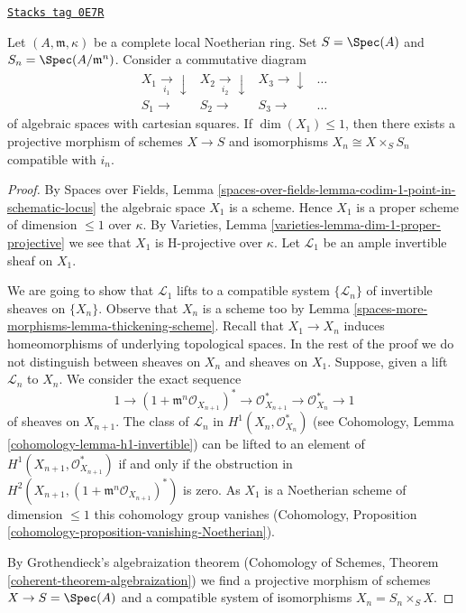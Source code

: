 \begin{lemma}
\label{spaces-more-morphisms-lemma-formal-algebraic-space-proper-reldim-1}
\href{https://stacks.math.columbia.edu/tag/0E7R}{\texttt{Stacks tag 0E7R}}

Let $(A, \mathfrak m, \kappa)$ be a complete local Noetherian ring.
Set $S = \Spec(A)$ and $S_n = \Spec(A/\mathfrak m^n)$.
Consider a commutative diagram
$$
\begin{array}{cccc}X_1 \underset{i_1}{\longrightarrow}\downarrow & X_2 \underset{i_2}{\longrightarrow}\downarrow & X_3 \longrightarrow\downarrow & \ldots \\ S_1 \longrightarrow & S_2 \longrightarrow & S_3 \longrightarrow & \ldots\end{array}
$$
of algebraic spaces with cartesian squares. If $\dim(X_1) \leq 1$,
then there exists a projective morphism of schemes $X \to S$
and isomorphisms $X_n \cong X \times_S S_n$ compatible with $i_n$.
\end{lemma}

\begin{proof}
By Spaces over Fields, Lemma
\ref{spaces-over-fields-lemma-codim-1-point-in-schematic-locus}
the algebraic space $X_1$ is a scheme. Hence $X_1$
is a proper scheme of dimension $\leq 1$ over $\kappa$.
By Varieties, Lemma \ref{varieties-lemma-dim-1-proper-projective}
we see that $X_1$ is H-projective over $\kappa$.
Let $\mathcal{L}_1$ be an ample invertible sheaf on $X_1$.

\medskip\noindent
We are going to show that $\mathcal{L}_1$ lifts to a compatible system
$\{\mathcal{L}_n\}$ of invertible sheaves on $\{X_n\}$.
Observe that $X_n$ is a scheme too by Lemma \ref{spaces-more-morphisms-lemma-thickening-scheme}.
Recall that $X_1 \to X_n$ induces homeomorphisms of underlying
topological spaces. In the rest of the proof we do not distinguish
between sheaves on $X_n$ and sheaves on $X_1$.
Suppose, given a lift $\mathcal{L}_n$ to $X_n$. We consider
the exact sequence
$$
1 \to
(1 + \mathfrak m^n\mathcal{O}_{X_{n + 1}})^* \to
\mathcal{O}_{X_{n + 1}}^* \to \mathcal{O}_{X_n}^* \to 1
$$
of sheaves on $X_{n + 1}$. The class of $\mathcal{L}_n$ in
$H^1(X_n, \mathcal{O}_{X_n}^*)$ (see
Cohomology, Lemma \ref{cohomology-lemma-h1-invertible})
can be lifted to an element of $H^1(X_{n + 1}, \mathcal{O}_{X_{n + 1}}^*)$
if and only if the obstruction in
$H^2(X_{n + 1}, (1 + \mathfrak m^n\mathcal{O}_{X_{n + 1}})^*)$
is zero. As $X_1$ is a Noetherian scheme of dimension $\leq 1$
this cohomology group vanishes (Cohomology, Proposition
\ref{cohomology-proposition-vanishing-Noetherian}).

\medskip\noindent
By Grothendieck's algebraization theorem
(Cohomology of Schemes, Theorem \ref{coherent-theorem-algebraization})
we find a projective morphism of schemes $X \to S = \Spec(A)$
and a compatible system of isomorphisms $X_n = S_n \times_S X$.
\end{proof}

